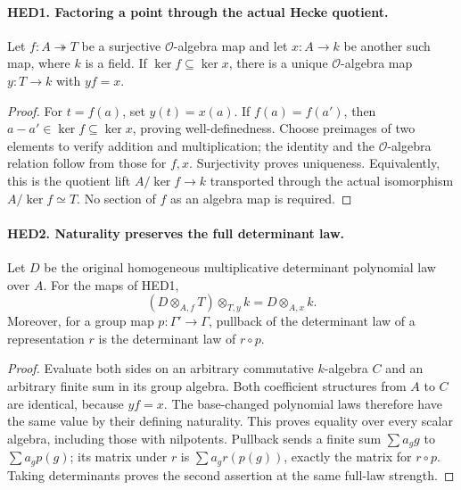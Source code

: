 \paragraph{HED1. Factoring a point through the actual Hecke quotient.}
\label{claim:HED1}
Let \(f:A\twoheadrightarrow T\) be a surjective \(\mathcal O\)-algebra
map and let \(x:A\to k\) be another such map, where \(k\) is a field.
If \(\ker f\subseteq\ker x\), there is a unique
\(\mathcal O\)-algebra map \(y:T\to k\) with \(y f=x\).
\begin{proof}
For \(t=f(a)\), set \(y(t)=x(a)\).  If \(f(a)=f(a')\), then
\(a-a'\in\ker f\subseteq\ker x\), proving well-definedness.
Choose preimages of two elements to verify addition and multiplication;
the identity and the \(\mathcal O\)-algebra relation follow from those
for \(f,x\).  Surjectivity proves uniqueness.  Equivalently, this is
the quotient lift \(A/\ker f\to k\) transported through the actual
isomorphism \(A/\ker f\simeq T\).  No section of \(f\) as an algebra
map is required.
\end{proof}

\paragraph{HED2. Naturality preserves the full determinant law.}
\label{claim:HED2}
Let \(D\) be the original homogeneous multiplicative determinant
polynomial law over \(A\).  For the maps of HED1,
\[
                  (D\otimes_{A,f}T)\otimes_{T,y}k
                              =D\otimes_{A,x}k.
 \tag{HED.2}
\]
Moreover, for a group map \(p:\Gamma'\to\Gamma\), pullback of the
determinant law of a representation \(r\) is the determinant law of
\(r\circ p\).
\begin{proof}
Evaluate both sides on an arbitrary commutative \(k\)-algebra \(C\)
and an arbitrary finite sum in its group algebra.  Both coefficient
structures from \(A\) to \(C\) are identical, because \(yf=x\).
The base-changed polynomial laws therefore have the same value by
their defining naturality.  This proves equality over every scalar
algebra, including those with nilpotents.  Pullback sends a finite sum
\(\sum a_g g\) to \(\sum a_g p(g)\); its matrix under \(r\) is
\(\sum a_g r(p(g))\), exactly the matrix for \(r\circ p\).
Taking determinants proves the second assertion at the same full-law
strength.
\end{proof}


